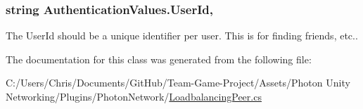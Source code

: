 \subsubsection[{\texorpdfstring{User\+Id}{UserId}}]{\setlength{\rightskip}{0pt plus 5cm}string Authentication\+Values.\+User\+Id\hspace{0.3cm}{\ttfamily [get]}, {\ttfamily [set]}}\hypertarget{class_authentication_values_a60a4d92454c4b2bbca1f299631da2f94}{}\label{class_authentication_values_a60a4d92454c4b2bbca1f299631da2f94}


The User\+Id should be a unique identifier per user. This is for finding friends, etc..



The documentation for this class was generated from the following file\+:\begin{DoxyCompactItemize}
\item 
C\+:/\+Users/\+Chris/\+Documents/\+Git\+Hub/\+Team-\/\+Game-\/\+Project/\+Assets/\+Photon Unity Networking/\+Plugins/\+Photon\+Network/\hyperlink{_loadbalancing_peer_8cs}{Loadbalancing\+Peer.\+cs}\end{DoxyCompactItemize}
